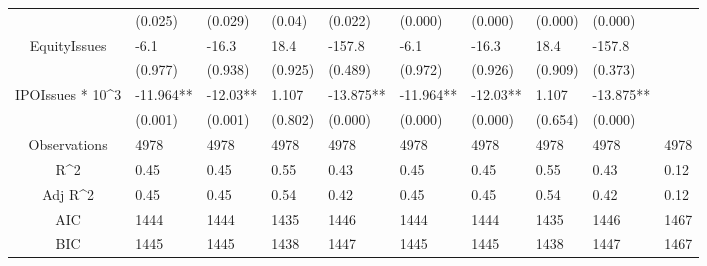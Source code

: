 \documentclass{article}
\begin{document}
\begin{table}[H]
\begin{tabular}{|clllllllll|}
   & (0.025) & (0.029) & (0.04) & (0.022) & (0.000) & (0.000) & (0.000) & (0.000) &  \\ 
  EquityIssues & -6.1 & -16.3 & 18.4 & -157.8 & -6.1 & -16.3 & 18.4 & -157.8 &  \\ 
   & (0.977) & (0.938) & (0.925) & (0.489) & (0.972) & (0.926) & (0.909) & (0.373) &  \\ 
  IPOIssues * 10^3 & -11.964** & -12.03** & 1.107 & -13.875** & -11.964** & -12.03** & 1.107 & -13.875** &  \\ 
   & (0.001) & (0.001) & (0.802) & (0.000) & (0.000) & (0.000) & (0.654) & (0.000) &  \\ 
  \hline 
 Observations & 4978 & 4978 & 4978 & 4978 & 4978 & 4978 & 4978 & 4978 & 4978 \\ 
  R^2 & 0.45 & 0.45 & 0.55 & 0.43 & 0.45 & 0.45 & 0.55 & 0.43 & 0.12 \\ 
  Adj R^2 & 0.45 & 0.45 & 0.54 & 0.42 & 0.45 & 0.45 & 0.54 & 0.42 & 0.12 \\ 
  AIC & 1444 & 1444 & 1435 & 1446 & 1444 & 1444 & 1435 & 1446 & 1467 \\ 
  BIC & 1445 & 1445 & 1438 & 1447 & 1445 & 1445 & 1438 & 1447 & 1467 \\ 
   \hline
\end{tabular}
 
\end{table}
\end{document}
